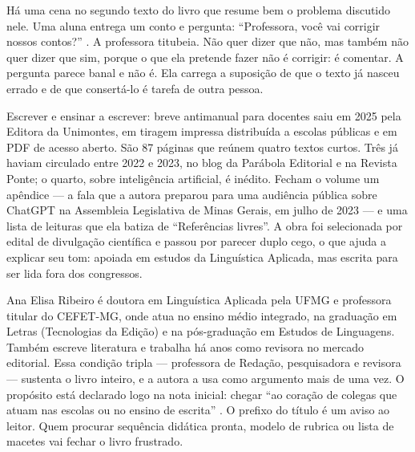\documentclass[portuguese]{textolivre}
\begin{document}
\begin{polyabstract}
\begin{english}
\begin{abstract}
\end{abstract}
\end{english}
\end{polyabstract}

Há uma cena no segundo texto do livro  que resume bem o problema discutido nele. Uma aluna entrega um conto e pergunta: “Professora, você vai corrigir nossos contos?” \cite[p.~23]{ribeiro2025escrever}. A professora titubeia. Não quer dizer que não, mas também não quer dizer que sim, porque o que ela pretende fazer não é corrigir: é comentar. A pergunta parece banal e não é. Ela carrega a suposição de que o texto já nasceu errado e de que consertá-lo é tarefa de outra pessoa.

Escrever e ensinar a escrever: breve antimanual para docentes saiu em 2025 pela Editora da Unimontes, em tiragem impressa distribuída a escolas públicas e em PDF de acesso aberto. São 87 páginas que reúnem quatro textos curtos. Três já haviam circulado entre 2022 e 2023, no blog da Parábola Editorial e na Revista Ponte; o quarto, sobre inteligência artificial, é inédito. Fecham o volume um apêndice — a fala que a autora preparou para uma audiência pública sobre ChatGPT na Assembleia Legislativa de Minas Gerais, em julho de 2023 — e uma lista de leituras que ela batiza de “Referências livres”. A obra foi selecionada por edital de divulgação científica e passou por parecer duplo cego, o que ajuda a explicar seu tom: apoiada em estudos da Linguística Aplicada, mas escrita para ser lida fora dos congressos.

Ana Elisa Ribeiro é doutora em Linguística Aplicada pela UFMG e professora titular do CEFET-MG, onde atua no ensino médio integrado, na graduação em Letras (Tecnologias da Edição) e na pós-graduação em Estudos de Linguagens. Também escreve literatura e trabalha há anos como revisora no mercado editorial. Essa condição tripla — professora de Redação, pesquisadora e revisora — sustenta o livro inteiro, e a autora a usa como argumento mais de uma vez. O propósito está declarado logo na nota inicial: chegar “ao coração de colegas que atuam nas escolas ou no ensino de escrita” \cite[p.~11]{ribeiro2025escrever}. O prefixo do título é um aviso ao leitor. Quem procurar sequência didática pronta, modelo de rubrica ou lista de macetes vai fechar o livro frustrado.
\end{document}

